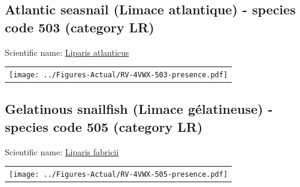 \documentclass[12pt]{article}\usepackage[]{graphicx}\usepackage[]{color}
\begin{document}
\renewcommand\thefigure{\thesubsection\Alph{figure}}

\setcounter{figure}{0}

\hypertarget{sec:503}{%
\subsection{Atlantic seasnail (Limace atlantique) - species code 503 (category LR)}\label{sec:503}}

  


Scientific name: \href{http://www.marinespecies.org/aphia.php?p=taxdetails\&id=159524}{Liparis atlanticus} \newline
\begin{minipage}{1.0\textwidth}
 \begin{tabular}{c}
\texttt{[image: ../Figures-Actual/RV-4VWX-503-presence.pdf]} \\ 
\end{tabular} 
\end{minipage}
\clearpage

\renewcommand\thefigure{\thesubsection\Alph{figure}}

\setcounter{figure}{0}

\hypertarget{sec:505}{%
\subsection{Gelatinous snailfish (Limace gélatineuse) - species code 505 (category LR)}\label{sec:505}}

  


Scientific name: \href{http://www.marinespecies.org/aphia.php?p=taxdetails\&id=127218}{Liparis fabricii} \newline
\begin{minipage}{1.0\textwidth}
 \begin{tabular}{c}
\texttt{[image: ../Figures-Actual/RV-4VWX-505-presence.pdf]} \\ 
\end{tabular} 
\end{minipage}
\clearpage
\end{document}
